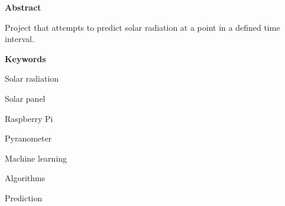 
\newpage

\thispagestyle{empty}

\begin{center}

{\bf \Huge Abstract}

  \end{center}
\vspace{1cm}

Project that attempts to predict solar radiation at a point in a defined time interval.

\vspace{1cm}

\begin{center}

{\bf \Large Keywords}
\vspace{1cm}

   Solar radiation
   \vspace{0.5cm}

   Solar panel
   \vspace{0.5cm}

   Raspberry Pi
   \vspace{0.5cm}

   Pyranometer
   \vspace{0.5cm}

   Machine learning
   \vspace{0.5cm}

   Algorithms
   \vspace{0.5cm}

   Prediction
   \vspace{0.5cm}

   \end{center}

   \vspace{0.5cm}
   


